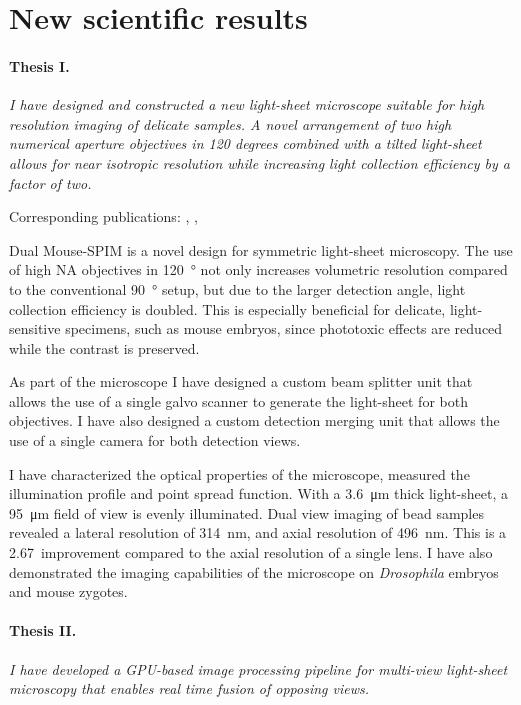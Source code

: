 
\section{New scientific results}

  \paragraph{Thesis I.}\textit{I have designed and constructed a new light-sheet microscope suitable for high resolution imaging of delicate samples. A novel arrangement of two high numerical aperture objectives in 120 degrees combined with a tilted light-sheet allows for near isotropic resolution while increasing light collection efficiency by a factor of two.}
  
    Corresponding publications: \cite{hoyer_breaking_2016}, \cite{strnad_inverted_2016}, \cite{de_medeiros_light-sheet_2016} 

    Dual Mouse-SPIM is a novel design for symmetric light-sheet microscopy. The use of high NA objectives in \SI{120}{\degree} not only increases volumetric resolution compared to the conventional \SI{90}{\degree} setup, but due to the larger detection angle, light collection efficiency is doubled. This is especially beneficial for delicate, light-sensitive specimens, such as mouse embryos, since phototoxic effects are reduced while the contrast is preserved.

    As part of the microscope I have designed a custom beam splitter unit that allows the use of a single galvo scanner to generate the light-sheet for both objectives. I have also designed a custom detection merging unit that allows the use of a single camera for both detection views.

    I have characterized the optical properties of the microscope, measured the illumination profile and point spread function. With a \SI{3.6}{\micro m} thick light-sheet, a \SI{95}{\micro m} field of view is evenly illuminated. Dual view imaging of bead samples revealed a lateral resolution of \SI{314}{nm}, and axial resolution of \SI{496}{nm}. This is a 2.67\texttimes\ improvement compared to the axial resolution of a single lens. I have also demonstrated the imaging capabilities of the microscope on \textit{Drosophila} embryos and mouse zygotes.


  \paragraph{Thesis II.} \textit{I have developed a GPU-based image processing pipeline for multi-view light-sheet microscopy that enables real time fusion of opposing views.}

